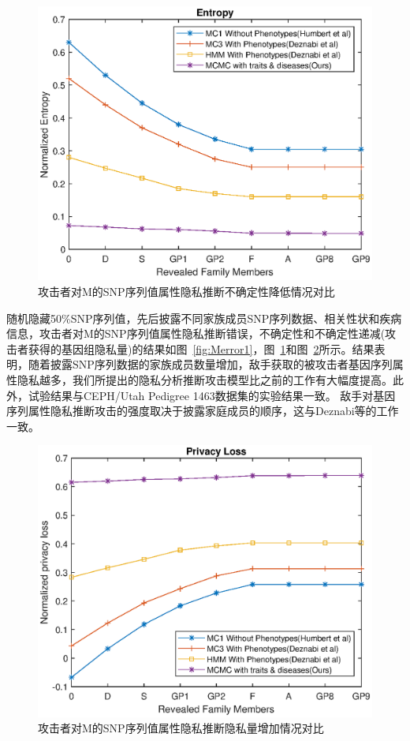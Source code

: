 \begin{figure}[htbp]
	\centering
	\includegraphics[width=0.8\linewidth]{./figures/Mentropy1.eps}
	\centering
	\caption{攻击者对M的SNP序列值属性隐私推断不确定性降低情况对比}\label{fig:Mentropy}
\end{figure}


随机隐藏50\%SNP序列值，先后披露不同家族成员SNP序列数据、相关性状和疾病信息，攻击者对M的SNP序列值属性隐私推断错误，不确定性和不确定性递减(攻击者获得的基因组隐私量)的结果如图~\ref{fig:Merror1}，图~\ref{fig:Mentropy}和图~\ref{fig:Mprivacyloss}所示。结果表明，随着披露SNP序列数据的家族成员数量增加，敌手获取的被攻击者基因序列属性隐私越多，我们所提出的隐私分析推断攻击模型比之前的工作有大幅度提高。此外，试验结果与CEPH/Utah Pedigree 1463数据集的实验结果一致。 敌手对基因序列属性隐私推断攻击的强度取决于披露家庭成员的顺序，这与Deznabi等的工作一致。

\begin{figure}[htbp]
	\centering
	\includegraphics[width=0.8\linewidth]{./figures/Mprivacyloss.eps}
	\centering
	\caption{攻击者对M的SNP序列值属性隐私推断隐私量增加情况对比}\label{fig:Mprivacyloss}
\end{figure}

